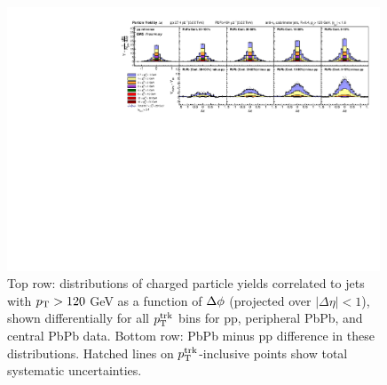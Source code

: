   \begin{figure}[hbt]
    \begin{center}
       \includegraphics[width=0.99\textwidth]{figures/results/Yield_dPhi_Stacked.pdf}
         \caption[Inclusive jet $\Delta\phi$ correlations at 5.02 TeV]{Top row:  distributions of charged particle yields correlated to jets with $p_{\rm T} > 120$ GeV as a function of $\protect\Delta\phi$ (projected over $|\Delta\eta| < 1$), shown differentially for all $p_{\rm T}^{\rm trk}$ bins for pp, peripheral PbPb, and central PbPb data. Bottom row:  PbPb minus pp difference in these distributions.  Hatched lines on $p_{\rm T}^{\rm trk}$-inclusive points show total systematic uncertainties.}
       \label{fig:yield_dphi_stacked}
    \end{center}
 \end{figure}
 
